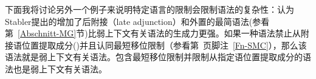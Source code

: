     下面我将讨论另外一个例子来说明特定语言的限制会限制语法的复杂性：\citet[Section~3.2]{GM2007a}认为Stabler提出的增加了后附接（late adjunction）和外置的最简语法\indexmg (参看第~\ref{Abschnitt-MG}节)比弱上下文有关语法的生成力更强。如果一种语法禁止从附接语位置提取成分(\citealp[]{FG2002a})并且认同最短移位限制（参看第~\pageref{Fn-SMC}页脚注~\ref{Fn-SMC}），那么该语法就是弱上下文有关语法\citep[]{GM2007a}。包含最短移位限制并限制从指定语位置提取成分的语法也是弱上下文有关语法。
